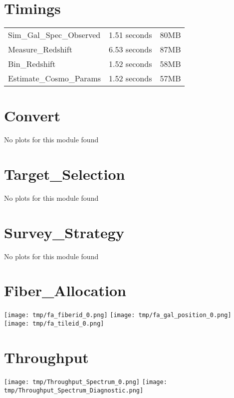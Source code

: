 \section{Timings}\begin{tabularx}{\textwidth}{lrr}Sim\_Gal\_Spec\_Observed&1.51 seconds & 80MB \\
Measure\_Redshift&6.53 seconds & 87MB \\
Bin\_Redshift&1.52 seconds & 58MB \\
Estimate\_Cosmo\_Params&1.52 seconds & 57MB \\
\end{tabularx}\section{Convert}
No plots for this module found\section{Target\_Selection}
No plots for this module found\section{Survey\_Strategy}
No plots for this module found\section{Fiber\_Allocation}
\texttt{[image: tmp/fa\_fiberid\_0.png]}
\texttt{[image: tmp/fa\_gal\_position\_0.png]}
\texttt{[image: tmp/fa\_tileid\_0.png]}
\section{Throughput}
\texttt{[image: tmp/Throughput\_Spectrum\_0.png]}
\texttt{[image: tmp/Throughput\_Spectrum\_Diagnostic.png]}

